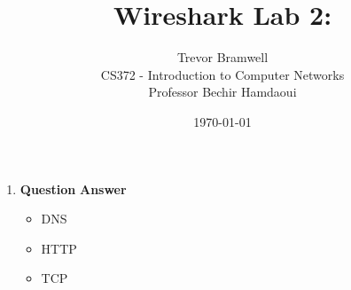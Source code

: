 \documentclass[12pt,letterpaper]{article}
\title{Wireshark Lab 2: }
\author{
    Trevor Bramwell \\
    CS372 - Introduction to Computer Networks \\
    Professor Bechir Hamdaoui
}
\date{\today}
\newcommand{\q}{\textbf{Question} }
\newcommand{\ans}{\textbf{Answer} }
\begin{document}
\maketitle

\begin{enumerate}
\item \q
\ans 
\begin{itemize}
    \item DNS
    \item HTTP
    \item TCP
\end{itemize}

\pagebreak

\pagebreak


\end{enumerate}
\end{document}
